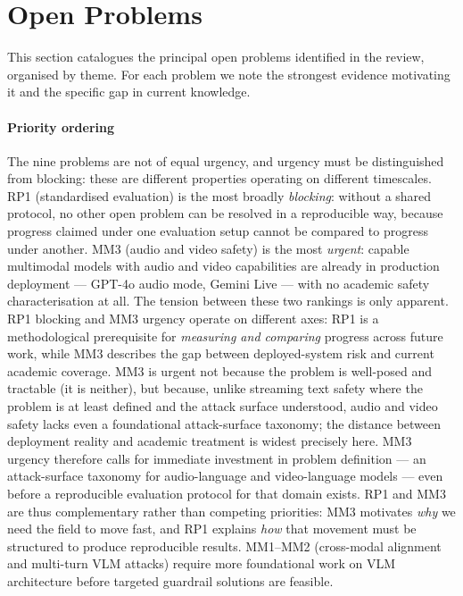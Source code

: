 \section{Open Problems}
\label{sec:open_problems}

This section catalogues the principal open problems identified in the review,
organised by theme.
For each problem we note the strongest evidence motivating it and the specific
gap in current knowledge.

\paragraph{Priority ordering}
The nine problems are not of equal urgency, and urgency must be distinguished from blocking: these are different properties operating on different timescales.
RP1 (standardised evaluation) is the most broadly \emph{blocking}: without a shared protocol, no other open problem can be resolved in a reproducible way, because progress claimed under one evaluation setup cannot be compared to progress under another.
MM3 (audio and video safety) is the most \emph{urgent}: capable multimodal models with audio and video capabilities are already in production deployment --- GPT-4o audio mode, Gemini Live --- with no academic safety characterisation at all.
The tension between these two rankings is only apparent.
RP1 blocking and MM3 urgency operate on different axes: RP1 is a methodological prerequisite for \emph{measuring and comparing} progress across future work, while MM3 describes the gap between deployed-system risk and current academic coverage.
MM3 is urgent not because the problem is well-posed and tractable (it is neither), but because, unlike streaming text safety where the problem is at least defined and the attack surface understood, audio and video safety lacks even a foundational attack-surface taxonomy; the distance between deployment reality and academic treatment is widest precisely here.
MM3 urgency therefore calls for immediate investment in problem definition --- an attack-surface taxonomy for audio-language and video-language models --- even before a reproducible evaluation protocol for that domain exists.
RP1 and MM3 are thus complementary rather than competing priorities: MM3 motivates \emph{why} we need the field to move fast, and RP1 explains \emph{how} that movement must be structured to produce reproducible results.
MM1--MM2 (cross-modal alignment and multi-turn VLM attacks) require more foundational work on VLM architecture before targeted guardrail solutions are feasible.
